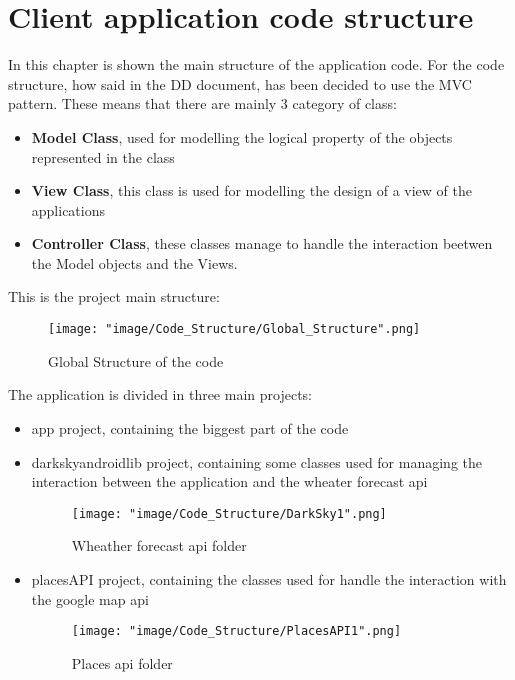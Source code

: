 \chapter{Client application code structure}

In this chapter is shown the main structure of the application code.
For the code structure, how said in the DD document, has been decided to use the MVC pattern. These means that there are mainly 3 category of class:

\begin{itemize}
\item \textbf{Model Class}, used for modelling the logical property of the objects represented in the class 

\item \textbf{View Class}, this class is used for modelling the design of a view of the applications

\item \textbf{Controller Class}, these classes manage to handle the interaction beetwen the Model objects and the Views.
\end{itemize}

This is the project main structure:

\begin{figure}[H]
\begin{center}
\texttt{[image: "image/Code\_Structure/Global\_Structure".png]}
\caption{Global Structure of the code}
\end{center}
\end{figure}

The application is divided in three main projects:

\begin{itemize}
\item app project, containing the biggest part of the code

\item darkskyandroidlib project, containing some classes used for managing the interaction between the application and the wheater forecast api
\begin{figure}[H]
\begin{center}
\texttt{[image: "image/Code\_Structure/DarkSky1".png]}
\caption{Wheather forecast api folder}
\end{center}
\end{figure}

\item placesAPI project, containing the classes used for handle the interaction with the google map api
\begin{figure}[H]
\begin{center}
\texttt{[image: "image/Code\_Structure/PlacesAPI1".png]}
\caption{Places api folder}
\end{center}
\end{figure}
\end{itemize}

